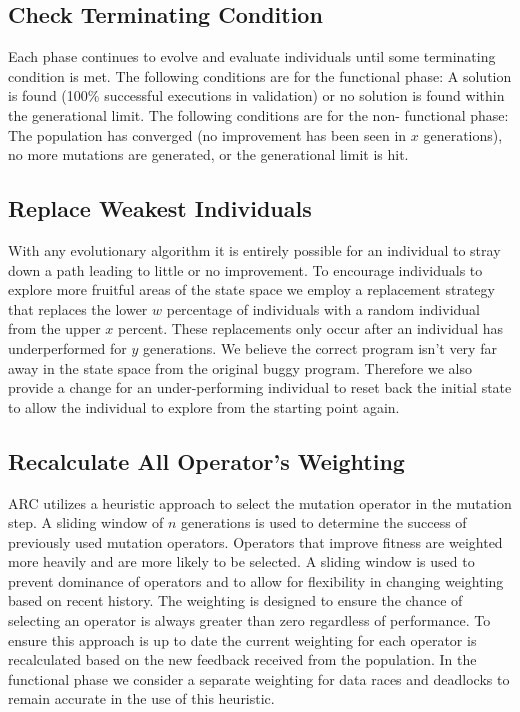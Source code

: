 \documentclass{llncs}
\begin{document}
\subsection{Check Terminating Condition}
\label{sec:check_terminating_condition}

Each phase continues to evolve and evaluate individuals until some terminating
condition is met. The following conditions are for the functional phase: A
solution is found (100\% successful executions in validation) or no solution is
found within the generational limit. The following conditions are for the non-
functional phase: The population has converged (no improvement has been seen in
$x$ generations), no more mutations are generated, or the generational limit is
hit.

\subsection{Replace Weakest Individuals}
\label{sec:replace_weakest_individuals}

With any evolutionary algorithm it is entirely possible for an individual to
stray down a path leading to little or no improvement. To encourage individuals
to explore more fruitful areas of the state space we employ a replacement
strategy that replaces the lower $w$ percentage of individuals with a random
individual from the upper $x$ percent. These replacements only occur after an
individual has underperformed for $y$ generations. We believe the correct
program isn't very far away in the state space from the original buggy program.
Therefore we also provide a change for an under-performing individual to reset
back the initial state to allow the individual to explore from the starting
point again.

\subsection{Recalculate All Operator's Weighting}
\label{sec:recalculate_operator_weighting}

ARC utilizes a heuristic approach to select the mutation operator in the
mutation step. A sliding window of $n$ generations is used to determine the
success of previously used mutation operators. Operators that improve fitness
are weighted more heavily and are more likely to be selected. A sliding window
is used to prevent dominance of operators and to allow for flexibility in
changing weighting based on recent history. The weighting is designed to ensure
the chance of selecting an operator is always greater than zero regardless of
performance. To ensure this approach is up to date the current weighting for
each operator is recalculated based on the new feedback received from the
population. In the functional phase we consider a separate weighting for data
races and deadlocks to remain accurate in the use of this heuristic.
\end{document}
